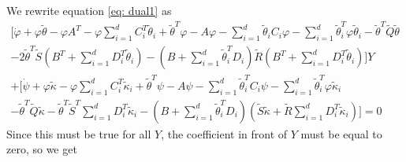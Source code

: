 We rewrite equation \eqref{eq: dual1} as
\begin{align}
    \bigg[ \dot{\varphi} + \varphi \tilde{\theta} - \varphi A^T - \varphi \sum_{i=1}^d C_i^T \tilde{\theta}_i + \tilde{\theta}^T \varphi - A \varphi -\sum_{i=1}^d \tilde{\theta}_i C_i \varphi - \sum_{i=1}^d\tilde{\theta}_i^T\varphi \tilde{\theta}_i - \tilde{\theta}^T \tilde{Q}\tilde{\theta}\\
    - 2\tilde{\theta}^T \tilde{S}(B^T + \sum_{i=1}^d D_i^T \tilde{\theta}_i) - (B + \sum_{i=1}^d\tilde{\theta}_i^T D_i)\tilde{R} (B^T + \sum_{i=1}^d D_i^T \tilde{\theta}_i)\bigg]Y\\
    + \bigg[ \dot{\psi} + \varphi \tilde{\kappa} - \varphi \sum_{i=1}^d C_i^T \tilde{\kappa}_i + \tilde{\theta}^T \psi - A \psi - \sum_{i=1}^d \tilde{\theta}_i^T C_i \psi - \sum_{i=1}^d \tilde{\theta}_i^T \varphi \tilde{\kappa}_i \\
    -\tilde{\theta}^T \tilde{Q} \tilde{\kappa} - \tilde{\theta}^T \tilde{S}^T\sum_{i=1}^d D_i^T\tilde{\kappa}_i - (B + \sum_{i=1}^d\tilde{\theta}_i^T D_i) (\tilde{S}\tilde{\kappa} + \tilde{R} \sum_{i=1}^d D_i^T \tilde{\kappa}_i)\bigg] = 0
\end{align}
Since this must be true for all $Y$, the coefficient in front of $Y$ must be equal to zero, so we get
